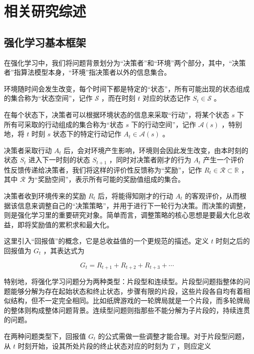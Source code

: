 

\chapter{相关研究综述}
\label{chpt:relatedwork}

\section{强化学习基本框架}

在强化学习中，我们将问题背景划分为“决策者”和“环境”两个部分，其中，“决策者”指算法模型本身，“环境”指决策者以外的信息集合。

环境随时间会发生改变，每个时间下都是特定的“状态”，所有可能出现的状态组成的集合称为“状态空间”，记作 $\mathcal S$ ，而在时刻 $t$ 对应的状态记作 $S_t\in \mathcal S$ 。

在每个状态下，决策者可以根据环境状态的信息来采取“行动”，将某个状态 $s$ 下所有可采取的行动组成的集合称为“状态 $s$ 下的行动空间”，记作 $\mathcal{A}(s)$ ，特别地，将 $t$ 时刻 $s$ 状态下的特定行动记作 $A_t\in\mathcal{A}(s)$ 。

决策者采取行动 $A_t$ 后，会对环境产生影响，环境则会因此发生改变，由本时刻的状态 $S_t$ 进入下一时刻的状态 $S_{t+1}$ ，同时对决策者刚才的行为 $A_t$ 产生一个评价性反馈传递给决策者，我们将这样的评价性反馈称为“奖励”，记作 $R_{t}\in\mathcal{R}\subset\mathbb{R}$ ，其中 $\mathcal{R}$ 为“奖励空间”，表示所有可能的奖励值组成的集合。

决策者收到环境传来的奖励 $R_{t}$ 后，将能得知刚才的行动 $A_t$ 的客观评价，从而根据该信息来调整自己的“决策策略”，并用于进行下一轮行为决策。而决策的调整，则是强化学习里的重要研究对象。简单而言，调整策略的核心思想是要最大化总收益，即将奖励值的累积求和最大化。

这里引入“回报值”的概念，它是总收益值的一个更规范的描述。定义 $t$ 时刻之后的回报值为 $G_t$ ，其表达式为

\begin{equation}
G_t = R_{t+1}+R_{t+2}+R_{t+3}+\cdots
\end{equation}

特别地，将强化学习问题分为两种类型：片段型和连续型。片段型问题指整体的问题能够分解为存在起始状态和终止状态，步骤有限的片段，这些片段各自均有着相似结构，但不一定完全相同。比如纸牌游戏的一轮牌局就是一个片段，而多轮牌局的整体则构成整体问题背景。连续型问题则指那些不能分解为子片段的，持续连贯的问题。

在两种问题类型下，回报值 $G_t$ 的公式需做一些调整才能合理。对于片段型问题，从 $t$ 时刻开始，设其所处片段的终止状态对应的时刻为 $T$ ，则应定义

